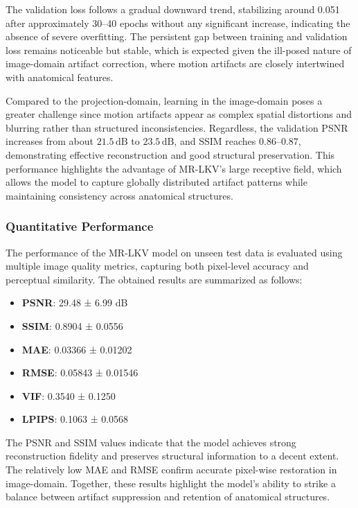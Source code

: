 The validation loss follows a gradual downward trend, stabilizing around 0.051 after approximately 30–40 epochs without any significant increase, indicating the absence of severe overfitting. The persistent gap between training and validation loss remains noticeable but stable, which is expected given the ill-posed nature of image-domain artifact correction, where motion artifacts are closely intertwined with anatomical features.

Compared to the projection-domain, learning in the image-domain poses a greater challenge since motion artifacts appear as complex spatial distortions and blurring rather than structured inconsistencies. Regardless, the validation PSNR increases from about $21.5\,\mathrm{dB}$ to $23.5\,\mathrm{dB}$, and SSIM reaches $0.86$--$0.87$, demonstrating effective reconstruction and good structural preservation. This performance highlights the advantage of MR-LKV's large receptive field, which allows the model to capture globally distributed artifact patterns while maintaining consistency across anatomical structures.



\subsubsection{Quantitative Performance}

The performance of the MR-LKV model on unseen test data is evaluated using multiple image quality metrics, capturing both pixel-level accuracy and perceptual similarity. The obtained results are summarized as follows:

\begin{itemize}
    \item \textbf{PSNR}: 29.48 ± 6.99 dB
    \item \textbf{SSIM}: 0.8904 ± 0.0556
    \item \textbf{MAE}: 0.03366 ± 0.01202
    \item \textbf{RMSE}: 0.05843 ± 0.01546
    \item \textbf{VIF}: 0.3540 ± 0.1250
    \item \textbf{LPIPS}: 0.1063 ± 0.0568
\end{itemize}

The PSNR and SSIM values indicate that the model achieves strong reconstruction fidelity  and preserves structural information to a decent extent. The relatively low MAE and RMSE confirm accurate pixel-wise restoration in image-domain. Together, these results highlight the model’s ability to strike a balance between artifact suppression and retention of anatomical structures. 

